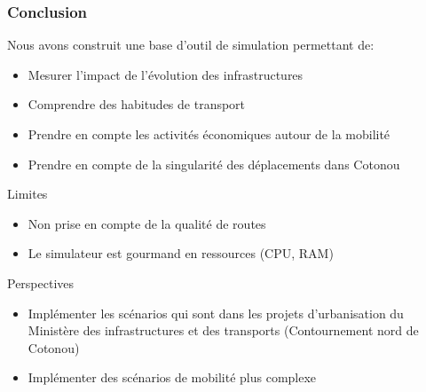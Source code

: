 \begin{frame}
    \frametitle{Conclusion}
        Nous avons construit une base d'outil de simulation permettant de:
    \begin{itemize}
        \item {} Mesurer l'impact de l'évolution des infrastructures
        \item {} Comprendre des habitudes de transport
        \item {} Prendre en compte les activités économiques autour de la mobilité
        \item {} Prendre en compte de la singularité des déplacements dans Cotonou
    \end{itemize}


    \begin{alertblock}{Limites}
        \begin{itemize}
            \item Non prise en compte de la qualité de routes
            \item Le simulateur est gourmand en ressources (CPU, RAM)
        \end{itemize}
    \end{alertblock}

    \begin{block}{Perspectives}
        \begin{itemize}
            \item Implémenter les scénarios qui sont dans les projets d'urbanisation du Ministère des infrastructures et des transports (Contournement nord de Cotonou)
            \item Implémenter des scénarios de mobilité plus complexe
        \end{itemize}
    \end{block}
\end{frame}

%

